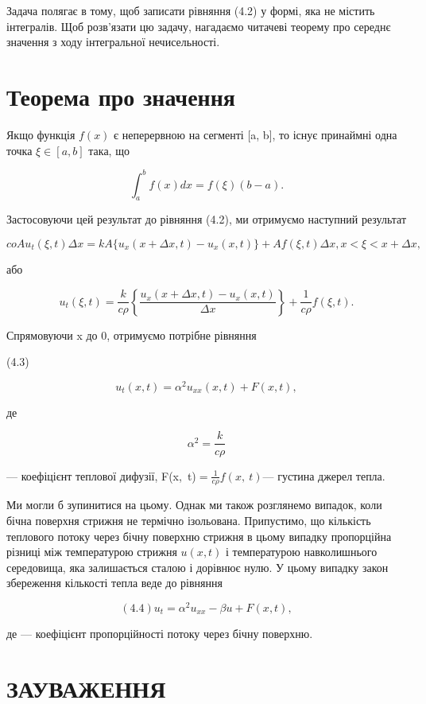 \documentclass[
  ukrainian,
]{article}
\begin{document}
Задача полягає в тому, щоб записати рівняння (4.2) у формі, яка не
містить інтегралів. Щоб розв'язати цю задачу, нагадаємо читачеві теорему
про середнє значення з ходу інтегральної нечисельності.

\section{Теорема про
значення}\label{ux442ux435ux43eux440ux435ux43cux430-ux43fux440ux43e-ux437ux43dux430ux447ux435ux43dux43dux44f}

Якщо функція \(f(x)\) є неперервною на сегменті {[}a, b{]}, то існує
принаймні одна точка \(\xi \in [a, b]\) така, що

\[
\int_{a}^{b} f(x) dx = f(\xi) (b-a).
\]

Застосовуючи цей результат до рівняння (4.2), ми отримуємо наступний
результат

\[
coAu_{t}(\xi, t) \Delta x = kA\{u_{x}(x + \Delta x, t) - u_{x}(x, t)\} + Af(\xi, t) \Delta x,
x < \xi < x + \Delta x,
\]

або

\[
u_t(\xi, t) = \frac{k}{c\rho} \left\{ \frac{u_x(x + \Delta x, t) - u_x(x, t)}{\Delta x} \right\} + \frac{1}{c\rho} f(\xi, t).
\]

Спрямовуючи \Delta x до 0, отримуємо потрібне рівняння

(4.3)

\[
u_t(x, t) = \alpha^2 u_{xx}(x, t) + F(x, t),
\]

де

\[
\alpha^{2}=\frac{k}{c\rho}
\]

--- коефіцієнт теплової дифузії,
F\left(x,~t\right)\(=\frac{1}{c\rho}f\left(x,\ t\right)\)--- густина
джерел тепла.

Ми могли б зупинитися на цьому. Однак ми також розглянемо випадок, коли
бічна поверхня стрижня не термічно ізольована. Припустимо, що кількість
теплового потоку через бічну поверхню стрижня в цьому випадку
пропорційна різниці між температурою стрижня \(u(x,t)\) і температурою
навколишнього середовища, яка залишається сталою і дорівнює нулю. У
цьому випадку закон збереження кількості тепла веде до рівняння

\[
(4.4) u_t = \alpha^2 u_{xx} - \beta u + F(x, t),
\]

де \beta --- коефіцієнт пропорційності потоку через бічну поверхню.

\section{ЗАУВАЖЕННЯ}\label{ux437ux430ux443ux432ux430ux436ux435ux43dux43dux44f-3}
\end{document}
